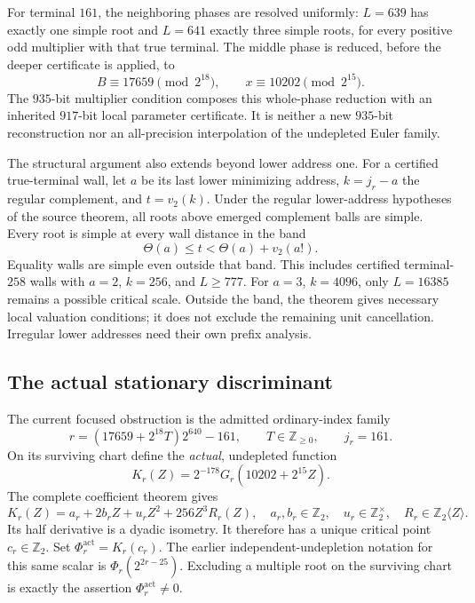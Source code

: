 For terminal $161$, the neighboring phases are resolved uniformly:
$L=639$ has exactly one simple root and $L=641$ exactly three simple
roots, for every positive odd multiplier with that true terminal.
The middle phase is reduced, before the deeper certificate is applied,
to
\[
 B\equiv17659\pmod{2^{18}},\qquad
 x\equiv10202\pmod{2^{15}}.
\]
The $935$-bit multiplier condition composes this whole-phase reduction
with an inherited $917$-bit local parameter certificate. It is neither
a new $935$-bit reconstruction nor an all-precision interpolation of
the undepleted Euler family.

The structural argument also extends beyond lower address one.
For a certified true-terminal wall, let $a$ be its last lower minimizing
address, $k=j_r-a$ the regular complement, and $t=v_2(k)$.
Under the regular lower-address hypotheses of the source theorem,
all roots above emerged complement balls are simple. Every root is
simple at every wall distance in the band
\[
 \Theta(a)\le t<\Theta(a)+v_2(a!).
\]
Equality walls are simple even outside that band. This includes
certified terminal-$258$ walls with $a=2$, $k=256$, and $L\ge777$.
For $a=3$, $k=4096$, only $L=16385$ remains a possible critical scale.
Outside the band, the theorem gives necessary local valuation conditions;
it does not exclude the remaining unit cancellation. Irregular lower
addresses need their own prefix analysis.

\subsection{The actual stationary discriminant}
\label{app:root:stationary}

The current focused obstruction is the admitted ordinary-index family
\begin{equation}
 r=(17659+2^{18}T)2^{640}-161,
 \qquad T\in\mathbb Z_{\ge0},\qquad j_r=161.
 \label{eq:root:focusedfamily}
\end{equation}
On its surviving chart define the \emph{actual}, undepleted function
\[
 K_r(Z)=2^{-178}G_r(10202+2^{15}Z).
\]
The complete coefficient theorem gives
\begin{equation}
 K_r(Z)=a_r+2b_rZ+u_rZ^2+256Z^3R_r(Z),
 \quad a_r,b_r\in\mathbb Z_2,\quad
 u_r\in\mathbb Z_2^\times,\quad
 R_r\in\mathbb Z_2\langle Z\rangle.
 \label{eq:root:quadraticclass}
\end{equation}
Its half derivative is a dyadic isometry. It therefore has a unique
critical point $c_r\in\mathbb Z_2$. Set
$\Phi_r^{\mathrm{act}}=K_r(c_r)$.
The earlier independent-undepletion notation for this same scalar is
$\Phi_r(2^{2r-25})$.
Excluding a multiple root on the surviving chart is exactly the assertion
$\Phi_r^{\mathrm{act}}\ne0$.

